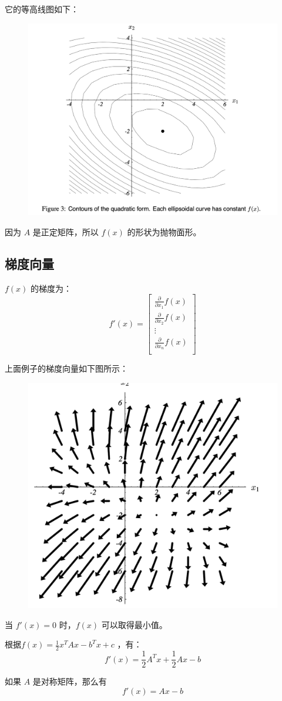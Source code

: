 \documentclass[12pt]{article}
\begin{document}
它的等高线图如下：
\begin{figure}[H]
    \centering
    \includegraphics[width=.6\textwidth]{fig/CG_Plot_Eq_3.png}
\end{figure}

因为 $A$ 是正定矩阵，所以 $f(x)$ 的形状为抛物面形。

\subsection{梯度向量}
$f(x)$ 的梯度为：
$$
f'(x) = \begin{bmatrix}
\frac{\partial}{\partial x_1}f(x) \\
\frac{\partial}{\partial x_2}f(x) \\
\vdots \\
\frac{\partial}{\partial x_n}f(x) \\
\end{bmatrix}
$$

上面例子的梯度向量如下图所示：
\begin{figure}[H]
    \centering
    \includegraphics[width=.4\textwidth]{fig/CG_Plot_Eq_4.png}
\end{figure}
当 $f'(x) = 0$ 时，$f(x)$ 可以取得最小值。

根据$f(x) = \frac{1}{2}x^TAx - b^Tx + c$ ，有：
$$
f'(x)  = \frac{1}{2}A^Tx + \frac{1}{2}Ax - b
$$

如果 $A$ 是对称矩阵，那么有
$$
f'(x) = Ax - b
$$
\end{document}
